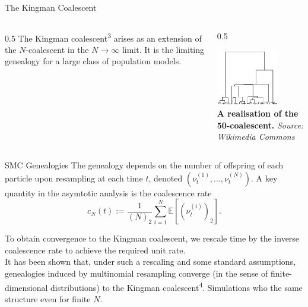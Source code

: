 \documentclass[final, 12pt]{beamer}
\newlength{\colwidth}
\newcommand{\vt}[2][t]{\nu_{#1}^{(#2)}}
\newcommand{\E}{\mathbb{E}}
\begin{document}
\begin{frame}
\begin{columns}
\begin{column}{\colwidth}
\begin{block}{The Kingman Coalescent}
\begin{columns}
\begin{column}{0.5\colwidth}
The Kingman coalescent\textsuperscript{3} arises as an extension of the $N$-coalescent in the $N\to\infty$ limit.
It is the limiting genealogy for a large class of population models.
\end{column}
\begin{column}{0.5\colwidth}
\begin{center}
\includegraphics[width=0.7\textwidth]{../kingman.png}\\
\small{
\textbf{A realisation of the 50-coalescent.}
\textit{Source: Wikimedia Commons}
}
\end{center}
\end{column}
\end{columns}
\end{block}

\begin{block}{SMC Genealogies}
The genealogy depends on the number of offspring of each particle upon resampling at each time $t$, denoted $(\vt{1}, \dots, \vt{N})$.
A key quantity in the asymtotic analysis is the coalescence rate
\begin{equation*}
c_N(t) := \frac{1}{(N)_2} \sum_{i=1}^{N} \E\left[ (\vt{i})_2 \right].
\end{equation*}

To obtain convergence to the Kingman coalescent, we rescale time by the inverse coalescence rate to achieve the required unit rate.\\[10pt]

It has been shown that, under such a rescaling and some standard assumptions, genealogies induced by multinomial resampling converge (in the sense of finite-dimensional distributions) to the Kingman coalescent\textsuperscript{4}. Simulations who the same structure even for finite $N$.\\[10pt]


\end{block}
\end{column}
\end{columns}
\end{frame}
\end{document}
